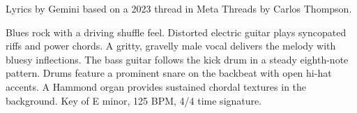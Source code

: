 

\begin{notes}
Lyrics by Gemini based on a 2023 thread in Meta Threads by Carlos Thompson.
\end{notes}
\begin{style}
Blues rock with a driving shuffle feel. %
Distorted electric guitar plays syncopated riffs and power chords. %
A gritty, gravelly male vocal delivers the melody with bluesy inflections. %
The bass guitar follows the kick drum in a steady eighth-note pattern. %
Drums feature a prominent snare on the backbeat with open hi-hat accents. %
A Hammond organ provides sustained chordal textures in the background. %
Key of E minor, 125 BPM, 4/4 time signature.
\end{style}
